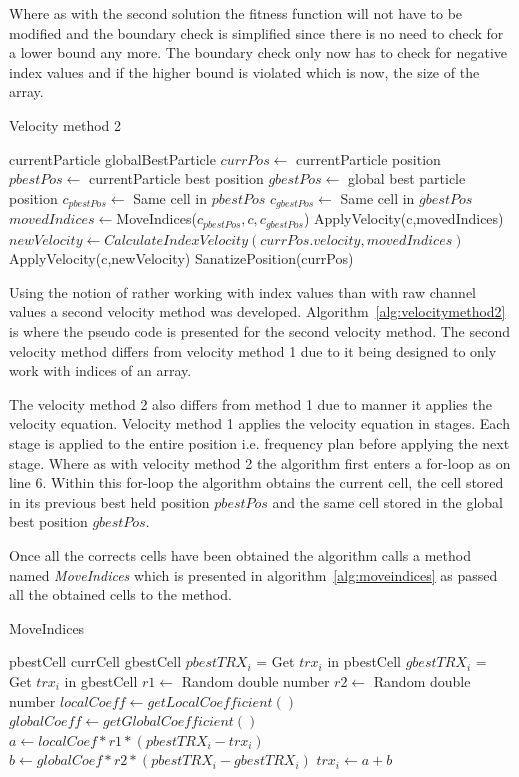 Where as with the second solution the fitness function will not have to be modified and the boundary check is simplified since there is no need to check for a lower bound any more. The boundary check only now has to check for negative index values and if the higher bound is violated which is now, the size of the array.
\begin{algorithm}
\caption{Velocity method 2}
\label{alg:velocitymethod2}
\begin{algorithmic}[1]
	\REQUIRE currentParticle
	\REQUIRE globalBestParticle
	\STATE $currPos \leftarrow$ currentParticle position
	\STATE $pbestPos \leftarrow$ currentParticle best position
	\STATE $gbestPos \leftarrow$ global best particle position
		\STATE $c_{pbestPos} \leftarrow $ Same cell in $pbestPos$
		\STATE $c_{gbestPos} \leftarrow $ Same cell in $gbestPos$
		\STATE $movedIndices \leftarrow $MoveIndices($c_{pbestPos},c,c_{gbestPos}$)
			\STATE ApplyVelocity(c,movedIndices)
		\ELSE
			\STATE $newVelocity \leftarrow CalculateIndexVelocity(currPos.velocity,movedIndices)$
			\STATE ApplyVelocity(c,newVelocity)
		\ENDIF
	\ENDFOR
	\STATE SanatizePosition(currPos)
\end{algorithmic}
\end{algorithm}
Using the notion of rather working with index values than with raw channel values a second velocity method was developed. Algorithm~\ref{alg:velocitymethod2} is where the pseudo code is presented for the second velocity method. The second velocity method differs from velocity method 1 due to it being designed to only work with indices of an array.

The velocity method 2 also differs from method 1 due to manner it applies the velocity equation. Velocity method 1 applies the velocity equation in stages. Each stage is applied to the entire position i.e. frequency plan before applying the next stage. Where as with velocity method 2 the algorithm first enters a for-loop as on line 6. Within this for-loop the algorithm obtains the current cell, the cell stored in its previous best held position $pbestPos$ and the same cell stored in the global best position $gbestPos$.

Once all the corrects cells have been obtained the algorithm calls a method named \emph{MoveIndices} which is presented in algorithm~\ref{alg:moveindices} as passed all the obtained cells to the method.
\begin{algorithm}
\caption {MoveIndices}
\label{alg:moveindices}
\begin{algorithmic}[1]
	\REQUIRE pbestCell
	\REQUIRE currCell
	\REQUIRE gbestCell
		\STATE $pbestTRX_i$ = Get $trx_i$ in pbestCell
		\STATE $gbestTRX_i$ = Get $trx_i$ in gbestCell
		\STATE $r1 \leftarrow$ Random double number
		\STATE $r2 \leftarrow$ Random double number
		\STATE $localCoeff \leftarrow getLocalCoefficient()$
		\STATE $globalCoeff \leftarrow getGlobalCoefficient()$
		\STATE $a \leftarrow localCoef * r1 * (pbestTRX_i - trx_i)$
		\STATE $b \leftarrow globalCoef * r2 * (pbestTRX_i - gbestTRX_i)$
		\STATE $trx_i \leftarrow a + b$
	\ENDFOR
\end{algorithmic}
\end{algorithm}

